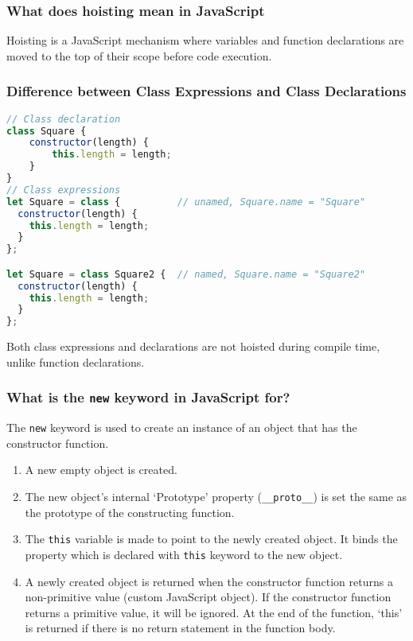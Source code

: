 \documentclass[12pt, a4paper]{article}
\newcommand{\code}[1]{\texttt{#1}}
\begin{document}
\subsubsection*{What does hoisting mean in JavaScript}
Hoisting is a JavaScript mechanism where variables and function declarations are moved to the top of their scope before code execution.

\subsubsection*{Difference between Class Expressions and Class Declarations}
\begin{mdframed}[backgroundcolor=light-gray, roundcorner=10pt,leftmargin=1, rightmargin=1, innerleftmargin=20, innertopmargin=5,innerbottommargin=5, outerlinewidth=1, linecolor=light-gray]
\begin{lstlisting}[language=JavaScript]
// Class declaration
class Square {
    constructor(length) {
        this.length = length;
    }
}
// Class expressions
let Square = class {          // unamed, Square.name = "Square"
  constructor(length) {
    this.length = length;
  }
};

let Square = class Square2 {  // named, Square.name = "Square2"
  constructor(length) {
    this.length = length;
  }
};
\end{lstlisting}
\end{mdframed}

Both class expressions and declarations are not hoisted during compile time, unlike function declarations.

\subsubsection*{What is the \code{new} keyword in JavaScript for?}
The \code{new} keyword is used to create an instance of an object that has the constructor function.
\begin{enumerate}
    \item A new empty object is created.
    \item The new object’s internal ‘Prototype’ property (\code{\_\_proto\_\_}) is set the same as the prototype of the constructing function.
    \item The \code{this} variable is made to point to the newly created object. It binds the property which is declared with \code{this} keyword to the new object.
    \item A newly created object is returned when the constructor function returns a non-primitive value (custom JavaScript object).
          If the constructor function returns a primitive value, it will be ignored.
          At the end of the function, ‘this’ is returned if there is no return statement in the function body.    
\end{enumerate}
\end{document}
